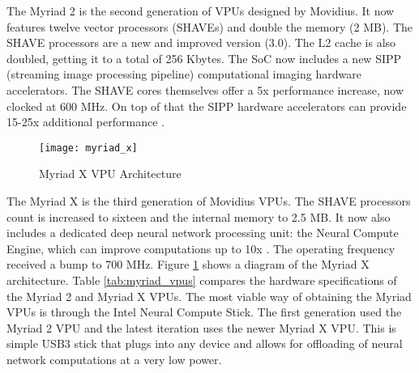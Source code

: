 The Myriad 2 is the second generation of VPUs designed by Movidius. It now features twelve vector processors (SHAVEs) and double the memory (2 MB). The SHAVE processors are a new and improved version (3.0). The L2 cache is also doubled, getting it to a total of 256 Kbytes. The SoC now includes a new SIPP (streaming image processing pipeline) computational imaging hardware accelerators. The SHAVE cores themselves offer a 5x performance increase, now clocked at 600 MHz. On top of that the SIPP hardware accelerators can provide 15-25x additional performance \cite{Moloney2014}.

\begin{figure}[thbp]
	\centering
	\texttt{[image: myriad\_x]}
	\caption[Myriad X VPU Architecture.]{Myriad X VPU Architecture \cite{myriad_vpus}}
	\label{fig:myriad_x}
\end{figure}

The Myriad X is the third generation of Movidius VPUs. The SHAVE processors count is increased to sixteen and the internal memory to 2.5 MB. It now also includes a dedicated deep neural network processing unit: the Neural Compute Engine, which can improve computations up to 10x \cite{myriadx}. The operating frequency received a bump to 700 MHz. Figure \ref{fig:myriad_x} shows a diagram of the Myriad X architecture. Table \ref{tab:myriad_vpus} compares the hardware specifications of the Myriad 2 and Myriad X VPUs. The most viable way of obtaining the Myriad VPUs is through the Intel Neural Compute Stick. The first generation used the Myriad 2 VPU and the latest iteration uses the newer Myriad X VPU. This is simple USB3 stick that plugs into any device and allows for offloading of neural network computations at a very low power. \cite{ncs2}

